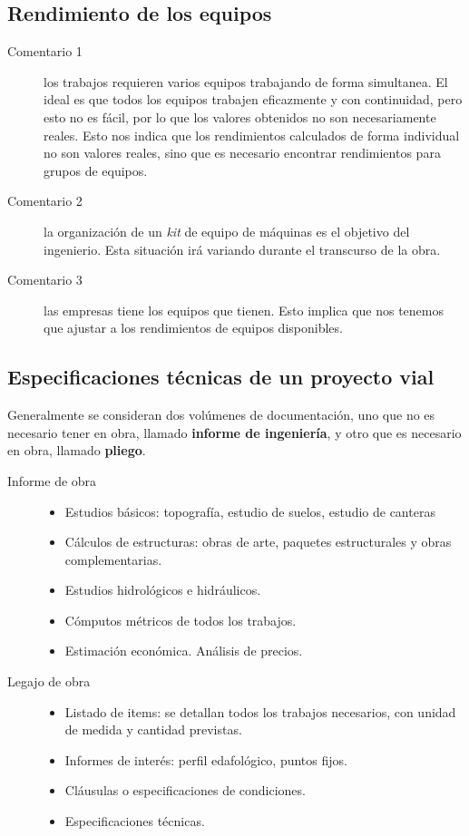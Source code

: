\documentclass[../main.tex]{subfiles}
\begin{document}
\subsection{Rendimiento de los equipos}

\begin{description}
  \item[Comentario 1] los trabajos requieren varios equipos trabajando de forma
    simultanea. El ideal es que todos los equipos trabajen eficazmente y con
    continuidad, pero esto no es fácil, por lo que los valores obtenidos no son
    necesariamente reales. Esto nos indica que los rendimientos calculados de
    forma individual no son valores reales, sino que es necesario encontrar 
    rendimientos para grupos de equipos.

  \item[Comentario 2] la organización de un \textit{kit} de equipo de máquinas
    es el objetivo del ingenierio. Esta situación irá variando durante el transcurso
    de la obra. 

  \item[Comentario 3] las empresas tiene los equipos que tienen. Esto implica que
    nos tenemos que ajustar a los rendimientos de equipos disponibles. 
\end{description}

\subsection{Especificaciones técnicas de un proyecto vial}

Generalmente se consideran dos volúmenes de documentación, uno que no es 
necesario tener en obra, llamado \textbf{informe de ingeniería}, y otro
que es necesario en obra, llamado \textbf{pliego}.

\begin{description}
  \item[Informe de obra] 
    \begin{itemize}
      \item Estudios básicos: topografía, estudio de suelos, estudio de canteras
      \item Cálculos de estructuras: obras de arte, paquetes estructurales y
        obras complementarias.
      \item Estudios hidrológicos e hidráulicos.
      \item Cómputos métricos de todos los trabajos.
      \item Estimación económica. Análisis de precios.
    \end{itemize}
  \item[Legajo de obra] 
    \begin{itemize}
      \item Listado de items: se detallan todos los trabajos necesarios, con
        unidad de medida y cantidad previstas.
      \item Informes de interés: perfil edafológico, puntos fijos.
      \item Cláusulas o especificaciones de condiciones.
      \item Especificaciones técnicas.
    \end{itemize}
\end{description}
\end{document}
